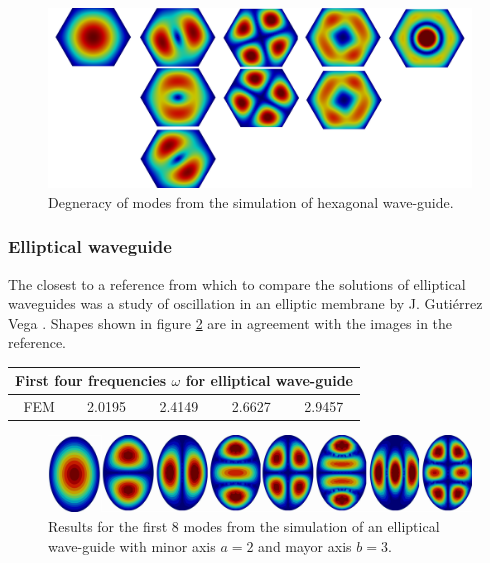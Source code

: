 \begin{figure}
\centering
\includegraphics[scale=0.07]{./img/hexagonal_waveguide.pdf}
\caption{Degneracy of modes from the simulation of hexagonal wave-guide.}
\label{fig:hexagonal_waveguide}
\end{figure}
\subsubsection{Elliptical waveguide}

The closest to a reference from which to compare the solutions of elliptical waveguides was a study of oscillation in an elliptic membrane by J. Guti\'errez Vega \cite{J.Gutierrez-Vega1999}. Shapes shown in figure \ref{fig:elliptical_waveguide} are in agreement with the images in the reference. 

\begin{center}
\begin{tabular}{|c|c|c|c|c|}
\hline
\multicolumn{5}{|c|}{First four frequencies $\omega$ for elliptical wave-guide} \\
\hline 
FEM     & 2.0195 & 2.4149 & 2.6627 & 2.9457 \\ 
\hline 
\end{tabular} 
\label{tab:eli_wav_comparison}
\end{center}
\begin{figure}
\centering
\includegraphics[scale=0.1]{./img/elliptical_waveguide.pdf}
\caption{Results for the first 8 modes from the simulation of an elliptical wave-guide with minor axis $a=2$ and mayor axis $b=3$.}
\label{fig:elliptical_waveguide}
\end{figure}

